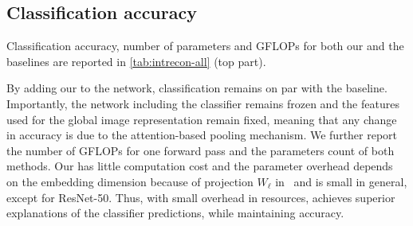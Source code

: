
\subsection{Classification accuracy}
\label{subsec:classification}


Classification accuracy, number of parameters and GFLOPs for both our \Ours and the baselines are reported in \autoref{tab:intrecon-all} (top part).

By adding our \Ours to the network, classification remains on par with the baseline. Importantly, the network including the classifier remains frozen and the features used for the global image representation remain fixed, meaning that any change in accuracy is due to the attention-based pooling mechanism. 
%
We further report the number of GFLOPs for one forward pass and the parameters count of both methods.
Our \Ours has little computation cost and the parameter overhead depends on the embedding dimension because of projection $W_\ell$ in~ and is small in general, except for ResNet-50. Thus, with small overhead in resources, \Ours achieves superior explanations of the classifier predictions, while maintaining accuracy.

